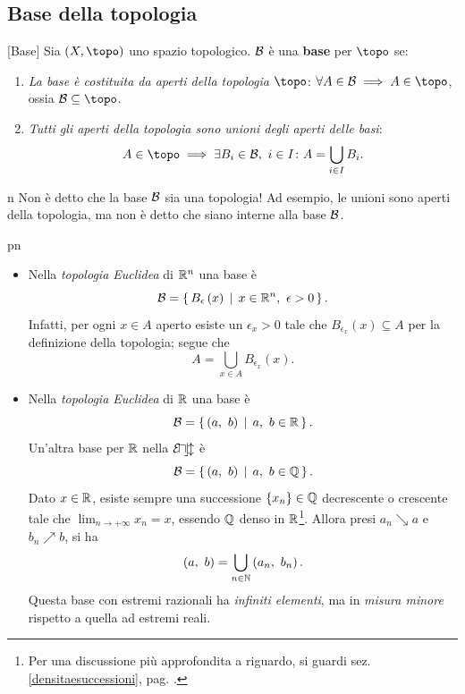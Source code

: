 \subsection{Base della topologia}
\begin{definition}{}[Base]
Sia $\left(X, \topo\right)$ uno spazio topologico. $\mathcal{B}$ è una \textbf{base} per $\topo$ se:
\begin{enumerate}
\item \textit{La base è costituita da aperti della topologia $\topo$}: $\forall A\in\basis\implies A\in\topo$, ossia $\basis\subseteq\topo$.
\item \textit{Tutti gli aperti della topologia sono unioni degli aperti delle basi}:
\begin{equation*}
	A\in\topo\implies\exists B_i\in\basis,\ i\in I\colon A=\bigcup_{i\in I}B_i.
\end{equation*}
\end{enumerate}
\end{definition}
\begin{warning}{n}
Non è detto che la base $\mathcal{B}$ sia una topologia! Ad esempio, le unioni sono aperti della topologia, ma non è detto che siano interne alla base $\mathcal{B}$.
\end{warning}
\begin{example}{pn}~{}
\begin{itemize}
\item Nella \textit{topologia Euclidea} di $\mathbb{R}^n$ una base è
\begin{equation*}
\basis=\Set{B_{\epsilon}\left(x\right) | x\in\R^n,\ \epsilon>0}.
\end{equation*}
Infatti, per ogni $x\in A$ aperto esiste un $\epsilon_x>0$ tale che $B_{\epsilon_x}\left(x\right)\subseteq A$ per la definizione della topologia; segue che
\begin{equation*}
	 A=\bigcup_{x\in A}B_{\epsilon_x}\left(x\right).
\end{equation*}
\item Nella \textit{topologia Euclidea} di $\mathbb{R}$ una base è
\begin{equation*}
	\basis=\Set{\left(a,\ b\right) | a,\ b\in \R}.
\end{equation*}
Un'altra base per $\mathbb{R}$ nella $\mathcal{E\! u\! c\! l}$ è 
\begin{equation*}
	\basis=\Set{\left(a,\ b\right) | a,\ b\in \Q}.
\end{equation*}
Dato $x\in\mathbb{R}$, esiste sempre una successione $\left\{x_n\right\}\in\mathbb{Q}$ decrescente o crescente tale che $\displaystyle\lim_{n \to +\infty}x_n=x$, essendo $\mathbb{Q}$ denso in $\mathbb{R}$\footnote{Per una discussione più approfondita a riguardo, si guardi sez. \ref{densitaesuccessioni}, pag. \pageref{densitaesuccessioni}.}. Allora presi $a_n\searrow a$ e $b_n\nearrow b$, si ha
\begin{equation*}
\left(a,\ b\right)=\bigcup_{n\in \mathbb{N}}\left(a_n,\ b_n\right).
\end{equation*}
Questa base con estremi razionali ha \textit{infiniti elementi}, ma in \textit{misura minore} rispetto a quella ad estremi reali.
\end{itemize}
\end{example}
